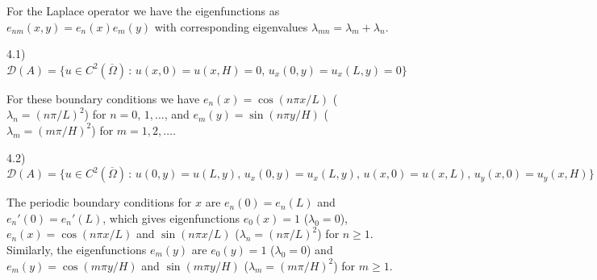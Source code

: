 
For the Laplace operator we have the eigenfunctions as $e_{nm}(x,y) = e_{n}(x) e_{m}(y)$ with corresponding eigenvalues $\lambda_{mn} = \lambda_{m} + \lambda_{n}$.

4.1) $\mathcal{D}(A) = \{ u \in C^2(\overline{\Omega}) \,:\, u(x,0) = u(x,H) = 0,\, u_{x}(0,y) = u_{x}(L,y) = 0 \}$

For these boundary conditions we have $e_{n}(x) = \cos{(n \pi x/L)}$ ($\lambda_{n} = (n \pi/L)^2$) for $n = 0,\,1,\ldots$, and $e_{m}(y) = \sin{(n \pi y/H)}$ ($\lambda_{m} = (m \pi/H)^2$) for $m = 1,2,\ldots$.


4.2) $\mathcal{D}(A) = \{ u \in C^2(\overline{\Omega}) \,:\, u(0,y)=u(L,y), \, u_{x}(0,y)=u_{x}(L,y), \, u(x,0)=u(x,L), \, u_{y}(x,0)=u_{y}(x,H) \}$

The periodic boundary conditions for $x$ are $e_{n}(0) = e_{n}(L)$ and $e_{n}'(0) = e_{n}'(L)$, which gives eigenfunctions $e_{0}(x) = 1$ ($\lambda_{0} = 0$), $e_{n}(x) = \cos{(n \pi x / L)}$ and $\sin{(n\pi x/L)}$ ($\lambda_{n} = (n \pi / L)^2$) for $n \geq 1$.
Similarly, the eigenfunctions $e_{m}(y)$ are $e_{0}(y) = 1$ ($\lambda_{0} = 0$) and $e_{m}(y) = \cos{(m\pi y/H)}$ and $\sin{(m \pi y/H)}$ ($\lambda_{m} = (m\pi/H)^2$) for $m \geq 1$.




